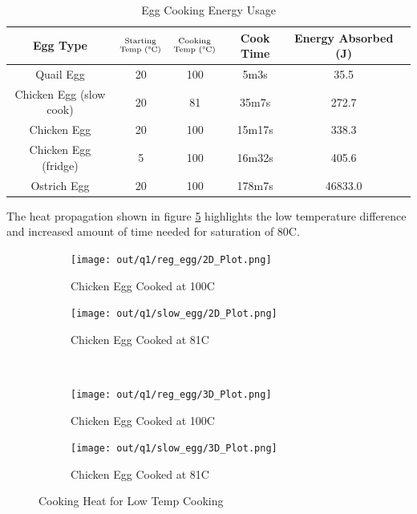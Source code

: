 \documentclass[12pt]{article}
\begin{document}
\begin{table}[H]
    \centering
    \caption{Egg Cooking Energy Usage}
    \label{tab:q1_efficiency}
    \begin{tabular}{|c|c|c|c|c|c|}
        \hline
        Egg Type & $\substack{\text{Starting} \\\text{Temp (\textdegree C)}}$ & $\substack{\text{Cooking} \\\text{Temp (\textdegree C)}}$ & Cook Time & Energy Absorbed (J) \\ \hline
        Quail Egg & 20 & 100 & 5m3s & 35.5 \\
        Chicken Egg (slow cook) & 20 & 81 & 35m7s & 272.7 \\
        Chicken Egg & 20 & 100 & 15m17s & 338.3 \\
        Chicken Egg (fridge) & 5 & 100 & 16m32s & 405.6 \\
        Ostrich Egg & 20 & 100 & 178m7s & 46833.0 \\
        \hline
    \end{tabular}
\end{table}

\noindent The heat propagation shown in figure \ref{fig:q1_efficiency} highlights the low temperature difference and increased amount of time needed for saturation of 80\textdegree C.

\begin{figure}[H]
    \centering
    \begin{subfigure}[]{0.48\textwidth}
        \centering
        \texttt{[image: out/q1/reg\_egg/2D\_Plot.png]}
        \caption{Chicken Egg Cooked at 100\textdegree C}
        \label{fig:q1_efficiency_2d_reg}
    \end{subfigure}
    \begin{subfigure}[]{0.48\textwidth}
        \centering
        \texttt{[image: out/q1/slow\_egg/2D\_Plot.png]}
        \caption{Chicken Egg Cooked at 81\textdegree C}
        \label{fig:q1_efficiency_2d_slow}
    \end{subfigure}
    \\
    \begin{subfigure}[]{0.48\textwidth}
        \centering
        \texttt{[image: out/q1/reg\_egg/3D\_Plot.png]}
        \caption{Chicken Egg Cooked at 100\textdegree C}
        \label{fig:q1_efficiency_3d_reg}
    \end{subfigure}
    \begin{subfigure}[]{0.48\textwidth}
        \centering
        \texttt{[image: out/q1/slow\_egg/3D\_Plot.png]}
        \caption{Chicken Egg Cooked at 81\textdegree C}
        \label{fig:q1_efficiency_3d_slow}
    \end{subfigure}
    \caption{Cooking Heat for Low Temp Cooking}
    \label{fig:q1_efficiency}
\end{figure}
\end{document}
